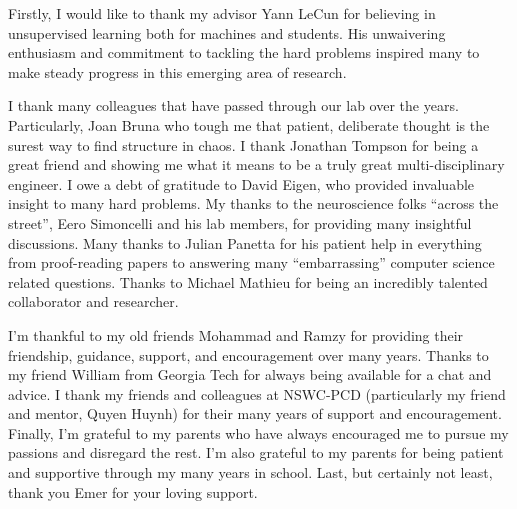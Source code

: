 Firstly, I would like to thank my advisor Yann LeCun for believing in
unsupervised learning both for machines and students. His unwaivering
enthusiasm and commitment to tackling the hard problems inspired many to make
steady progress in this emerging area of research.

I thank many colleagues that have passed through our lab over the years. 
Particularly, Joan Bruna who tough me that patient, deliberate thought is the
surest way to find structure in chaos.  I thank Jonathan Tompson for being a
great friend and showing me what it means to be a truly great
multi-disciplinary engineer.  I owe a debt of gratitude to David Eigen, who
provided invaluable insight to many hard problems. My thanks to the
neuroscience folks ``across the street'', Eero Simoncelli and his lab members,
for providing many insightful discussions. Many thanks to Julian Panetta for
his patient help in everything from proof-reading papers to answering many
``embarrassing'' computer science related questions. Thanks to Michael Mathieu 
for being an incredibly talented collaborator and researcher.     
      
I'm thankful to my old friends Mohammad and Ramzy for providing their
friendship, guidance, support, and encouragement over many years.  Thanks to my
friend William from Georgia Tech for always being available for a chat and
advice.  I thank my friends and colleagues at NSWC-PCD (particularly my friend
and mentor, Quyen Huynh) for their many years of support and encouragement.
Finally, I'm grateful to my parents who have always encouraged me to pursue my
passions and disregard the rest. I'm also grateful to my parents for being
patient and supportive through my many years in school.  Last, but certainly
not least, thank you Emer for your loving support.  

 
